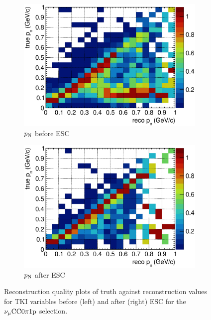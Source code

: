 \begin{figure}
\begin{subfigure}[b]{\dbfigwid\textwidth}
          \end{subfigure}
          \\
          \begin{subfigure}[b]{\dbfigwid\textwidth}
               \centering
               \includegraphics[width=\textwidth]{figures/perf/tki/pn_colnor_resmat_al13.eps}
               \caption{$p_\textrm{N}$ before ESC}
               \label{subfig:esc-pn-bfesc}
          \end{subfigure}
          \begin{subfigure}[b]{\dbfigwid\textwidth}
               \centering
               \includegraphics[width=\textwidth]{figures/perf/tki/pn_colnor_resmat_al14.eps}
               \caption{$p_\textrm{N}$ after ESC}
               \label{subfig:esc-pn-afesc}
          \end{subfigure}
          \caption{Reconstruction quality plots of truth against reconstruction values for TKI variables before (left) and after (right) ESC for the $\nu_{\mu}\textrm{CC}0\pi1\textrm{p}$ selection.}
          \label{fig:mc-tki-0pi-esc}
     \end{figure}

